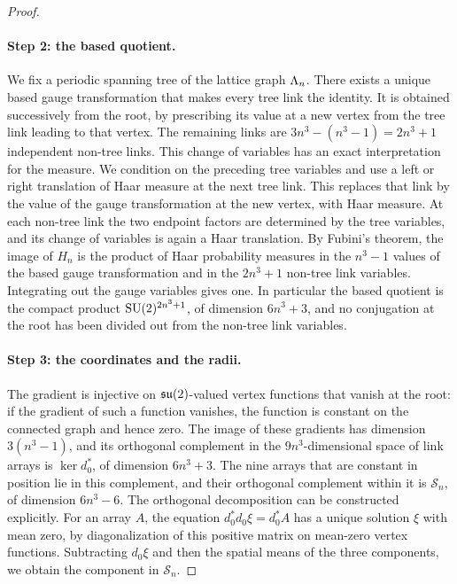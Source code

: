 \begin{proof}
\paragraph{Step 2: the based quotient.}
We fix a periodic spanning tree of the lattice graph $\Lambda_{n}$. There exists a unique based gauge transformation that makes every tree link the identity. It is obtained successively from the root, by prescribing its value at a new vertex from the tree link leading to that vertex. The remaining links are $3n^3-(n^3-1)=2n^3+1$ independent non-tree links. This change of variables has an exact interpretation for the measure. We condition on the preceding tree variables and use a left or right translation of Haar measure at the next tree link. This replaces that link by the value of the gauge transformation at the new vertex, with Haar measure. At each non-tree link the two endpoint factors are determined by the tree variables, and its change of variables is again a Haar translation. By Fubini's theorem, the image of $H_n$ is the product of Haar probability measures in the $n^3-1$ values of the based gauge transformation and in the $2n^3+1$ non-tree link variables. Integrating out the gauge variables gives one. In particular the based quotient is the compact product $\mathrm{SU}(2)^{2n^3+1}$, of dimension $6n^3+3$, and no conjugation at the root has been divided out from the non-tree link variables.

\paragraph{Step 3: the coordinates and the radii.}
The gradient is injective on $\mathfrak{su}(2)$-valued vertex functions that vanish at the root: if the gradient of such a function vanishes, the function is constant on the connected graph and hence zero. The image of these gradients has dimension $3(n^3-1)$, and its orthogonal complement in the $9n^3$-dimensional space of link arrays is $\ker d_0^*$, of dimension $6n^3+3$. The nine arrays that are constant in position lie in this complement, and their orthogonal complement within it is $\mathcal S_n$, of dimension $6n^3-6$. The orthogonal decomposition can be constructed explicitly. For an array $A$, the equation $d_0^*d_0\xi=d_0^*A$ has a unique solution $\xi$ with mean zero, by diagonalization of this positive matrix on mean-zero vertex functions. Subtracting $d_0\xi$ and then the spatial means of the three components, we obtain the component in $\mathcal S_n$.


\end{proof}
